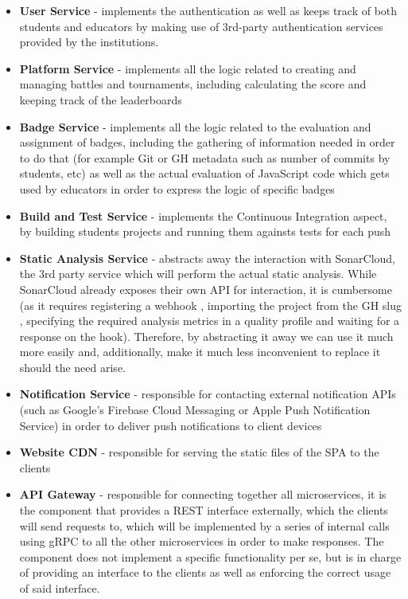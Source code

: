 \begin{itemize}
    \item \textbf{User Service} {-} implements the authentication as well as keeps track of both students and educators by making
          use of 3rd-party authentication services provided by the institutions.
    \item \textbf{Platform Service} {-} implements all the logic related to creating and managing battles and tournaments, including
          calculating the score and keeping track of the leaderboards
    \item \textbf{Badge Service} {-} implements all the logic related to the evaluation and assignment of badges, including the gathering
          of information needed in order to do that (for example Git or GH metadata such as number of commits by students, etc)
          as well as the actual evaluation of JavaScript code which gets used by educators in order to express the logic of
          specific badges
    \item \textbf{Build and Test Service} {-} implements the Continuous Integration aspect, by building students projects and
          running them againsts tests for each push
    \item \textbf{Static Analysis Service} {-} abstracts away the interaction with SonarCloud, the 3rd party service which will
          perform the actual static analysis. While SonarCloud already exposes their own API for interaction, it is cumbersome
          (as it requires registering a webhook \cite{SonarCloudWh}, importing the project from the GH slug \cite{SonarCloudGh},
          specifying the required analysis metrics in a quality profile \cite{SonarCloudQp} and waiting for a response on the hook).
          Therefore, by abstracting it away we can use it much more easily and, additionally, make it much less inconvenient to
          replace it should the need arise.
    \item \textbf{Notification Service} {-} responsible for contacting external notification APIs
          (such as Google's Firebase Cloud Messaging or Apple Push Notification Service) in order to deliver push notifications
          to client devices
    \item \textbf{Website CDN} {-} responsible for serving the static files of the SPA to the clients
    \item \textbf{API Gateway} {-} responsible for connecting together all microservices, it is the component that provides a REST
          interface externally, which the clients will send requests to, which will be implemented by a series of internal calls
          using gRPC \cite{gRPC} to all the other microservices in order to make responses. The component does not implement a specific
          functionality per se, but is in charge of providing an interface to the clients as well as enforcing the correct usage
          of said interface.
\end{itemize}


